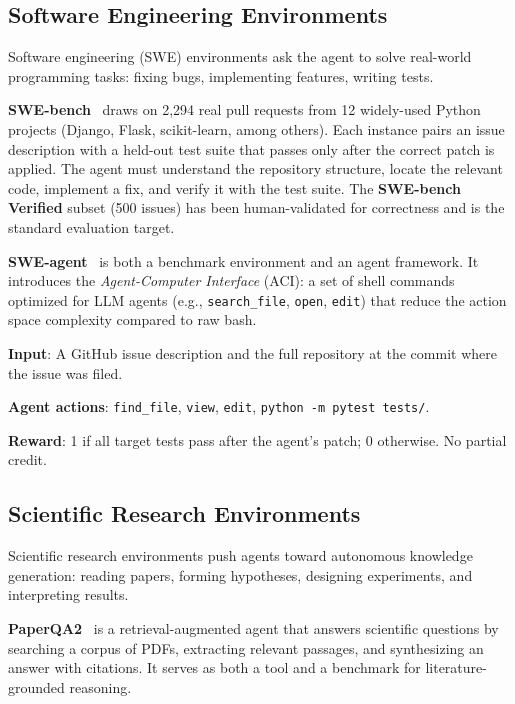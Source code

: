 \subsection{Software Engineering Environments}
\label{software-engineering-environments}

Software engineering (SWE) environments ask the agent to solve real-world programming tasks: fixing bugs, implementing features, writing tests.

\textbf{SWE-bench}~\cite{jimenez2024swebench} draws on 2,294 real pull requests from 12 widely-used Python projects (Django, Flask, scikit-learn, among others). Each instance pairs an issue description with a held-out test suite that passes only after the correct patch is applied. The agent must understand the repository structure, locate the relevant code, implement a fix, and verify it with the test suite. The \textbf{SWE-bench Verified} subset (500 issues) has been human-validated for correctness and is the standard evaluation target.

\textbf{SWE-agent}~\cite{yang2024sweagent} is both a benchmark environment and an agent framework. It introduces the \emph{Agent-Computer Interface} (ACI): a set of shell commands optimized for LLM agents (e.g., \texttt{search\_file}, \texttt{open}, \texttt{edit}) that reduce the action space complexity compared to raw bash.

\begin{examplebox}
\textbf{Input}: A GitHub issue description and the full repository at the commit where the issue was filed.

\textbf{Agent actions}: \texttt{find\_file}, \texttt{view}, \texttt{edit}, \texttt{python -m pytest tests/}.

\textbf{Reward}: 1 if all target tests pass after the agent’s patch; 0 otherwise. No partial credit.
\end{examplebox}

\subsection{Scientific Research Environments}
\label{scientific-research-environments}

Scientific research environments push agents toward autonomous knowledge generation: reading papers, forming hypotheses, designing experiments, and interpreting results.

\textbf{PaperQA2}~\cite{lala2023paperqa} is a retrieval-augmented agent that answers scientific questions by searching a corpus of PDFs, extracting relevant passages, and synthesizing an answer with citations. It serves as both a tool and a benchmark for literature-grounded reasoning.

